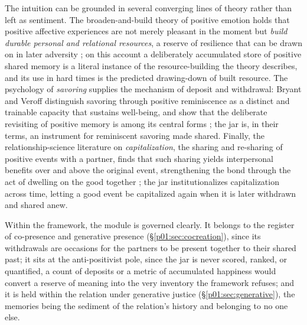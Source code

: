 The intuition can be grounded in several converging lines of theory rather than left as sentiment. The broaden-and-build theory of positive emotion holds that positive affective experiences are not merely pleasant in the moment but \emph{build durable personal and relational resources}, a reserve of resilience that can be drawn on in later adversity \parencite{fredrickson2001role}; on this account a deliberately accumulated store of positive shared memory is a literal instance of the resource-building the theory describes, and its use in hard times is the predicted drawing-down of built resource. The psychology of \emph{savoring} supplies the mechanism of deposit and withdrawal: Bryant and Veroff distinguish savoring through positive reminiscence as a distinct and trainable capacity that sustains well-being, and show that the deliberate revisiting of positive memory is among its central forms \parencite{bryant2007savoring}; the jar is, in their terms, an instrument for reminiscent savoring made shared. Finally, the relationship-science literature on \emph{capitalization}, the sharing and re-sharing of positive events with a partner, finds that such sharing yields interpersonal benefits over and above the original event, strengthening the bond through the act of dwelling on the good together \parencite{gable2004what}; the jar institutionalizes capitalization across time, letting a good event be capitalized again when it is later withdrawn and shared anew.

Within the framework, the module is governed clearly. It belongs to the register of co-presence and generative presence (§\ref{p01:sec:cocreation}), since its withdrawals are occasions for the partners to be present together to their shared past; it sits at the anti-positivist pole, since the jar is never scored, ranked, or quantified, a count of deposits or a metric of accumulated happiness would convert a reserve of meaning into the very inventory the framework refuses; and it is held within the relation under generative justice (§\ref{p01:sec:generative}), the memories being the sediment of the relation's history and belonging to no one else.

